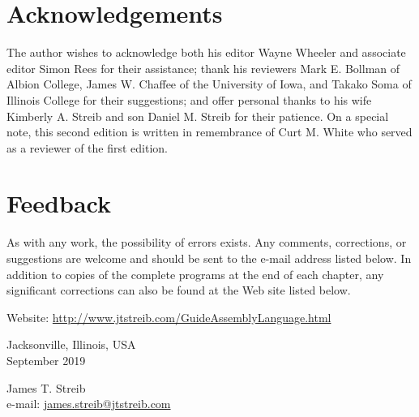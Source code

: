 \documentclass[10pt]{article}
\begin{document}
\section*{Acknowledgements}
The author wishes to acknowledge both his editor Wayne Wheeler and associate editor Simon Rees for their assistance; thank his reviewers Mark E. Bollman of Albion College, James W. Chaffee of the University of Iowa, and Takako Soma of Illinois College for their suggestions; and offer personal thanks to his wife Kimberly A. Streib and son Daniel M. Streib for their patience. On a special note, this second edition is written in remembrance of Curt M. White who served as a reviewer of the first edition.

\section*{Feedback}
As with any work, the possibility of errors exists. Any comments, corrections, or suggestions are welcome and should be sent to the e-mail address listed below. In addition to copies of the complete programs at the end of each chapter, any significant corrections can also be found at the Web site listed below.

Website: \href{http://www.jtstreib.com/GuideAssemblyLanguage.html}{http://www.jtstreib.com/GuideAssemblyLanguage.html}

Jacksonville, Illinois, USA\\
September 2019

James T. Streib\\
e-mail: \href{mailto:james.streib@jtstreib.com}{james.streib@jtstreib.com}
\end{document}
